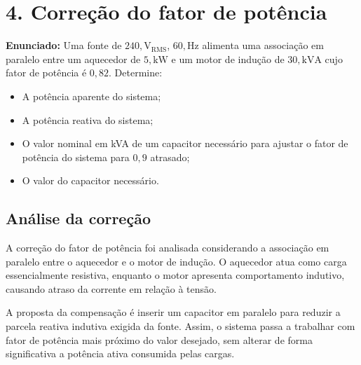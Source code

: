 \documentclass[12pt,a4paper]{article}
\begin{document}
\newpage
\section*{4. Correção do fator de potência}

\textbf{Enunciado:} Uma fonte de $240,\mathrm{V_{RMS}}$, $60,\mathrm{Hz}$ alimenta uma associação em paralelo entre um aquecedor de $5,\mathrm{kW}$ e um motor de indução de $30,\mathrm{kVA}$ cujo fator de potência é $0{,}82$. Determine:

\begin{itemize}
\item[(a)] A potência aparente do sistema;
\item[(b)] A potência reativa do sistema;
\item[(c)] O valor nominal em kVA de um capacitor necessário para ajustar o fator de potência do sistema para $0{,}9$ atrasado;
\item[(d)] O valor do capacitor necessário.
\end{itemize}

\subsection*{Análise da correção}

A correção do fator de potência foi analisada considerando a associação em paralelo entre o aquecedor e o motor de indução. O aquecedor atua como carga essencialmente resistiva, enquanto o motor apresenta comportamento indutivo, causando atraso da corrente em relação à tensão.

A proposta da compensação é inserir um capacitor em paralelo para reduzir a parcela reativa indutiva exigida da fonte. Assim, o sistema passa a trabalhar com fator de potência mais próximo do valor desejado, sem alterar de forma significativa a potência ativa consumida pelas cargas.
\end{document}
